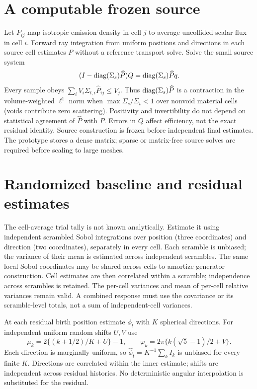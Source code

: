 \documentclass[11pt]{article}
\begin{document}
\section{A computable frozen source}
Let $P_{ij}$ map isotropic emission density in cell $j$ to average uncollided
scalar flux in cell $i$. Forward ray integration from uniform positions and
directions in each source cell estimates $P$ without a reference transport solve.
Solve the small source system
\begin{equation}
 (I-\mathop{\rm diag}(\Sigma_s)\widehat P)Q
 =\mathop{\rm diag}(\Sigma_s)\widehat Pq.
\end{equation}
Every sample obeys $\sum_i V_i\Sigma_{t,i}\widehat P_{ij}\le V_j$.
Thus $\mathop{\rm diag}(\Sigma_s)\widehat P$ is a contraction in the volume-weighted
$\ell^1$ norm when $\max\Sigma_s/\Sigma_t<1$ over nonvoid material cells
(voids contribute zero scattering). Positivity and invertibility do not
depend on statistical agreement of $\widehat P$ with $P$. Errors in $Q$ affect
efficiency, not the exact residual identity. Source construction is frozen before
independent final estimates. The prototype stores a dense matrix; sparse or
matrix-free source solves are required before scaling to large meshes.

\section{Randomized baseline and residual estimates}
The cell-average trial tally is not known analytically. Estimate it using
independent scrambled Sobol integrations over position (three coordinates) and
direction (two coordinates), separately in every cell. Each scramble is unbiased;
the variance of their mean is estimated across independent scrambles.
The same local Sobol coordinates may be shared across cells to amortize generator
construction. Cell estimates are then correlated within a scramble; independence
across scrambles is retained. The per-cell variances and mean of per-cell relative
variances remain valid. A combined response must use the covariance or its
scramble-level totals, not a sum of independent-cell variances.

At each residual birth position estimate $\phi_t$ with $K$ spherical directions.
For independent uniform random shifts $U,V$ use
\begin{equation}
 \mu_k=2\{(k+1/2)/K+U\}-1,\qquad
 \varphi_k=2\pi\{k(\sqrt5-1)/2+V\}.
\end{equation}
Each direction is marginally uniform, so $\widehat\phi_t=K^{-1}\sum_k I_k$
is unbiased for every finite $K$. Directions are correlated within the inner
estimate; shifts are independent across residual histories. No deterministic
angular interpolation is substituted for the residual.
\end{document}
